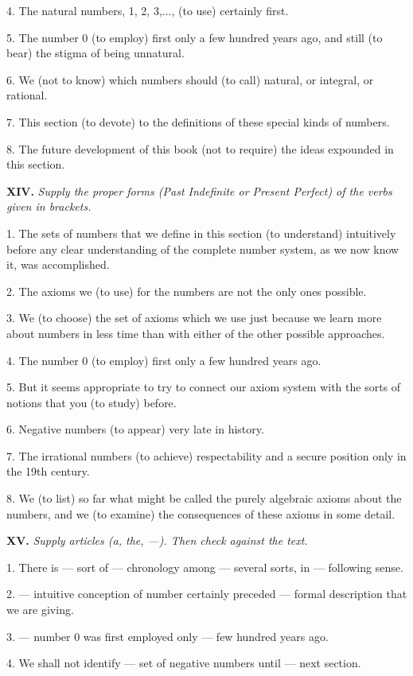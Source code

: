 \documentclass[a4paper]{article}
\newcommand{\ETask}[2]{\medskip\par\textbf{#1.} \textit{#2}\par}
\begin{document}
4. The natural numbers, 1, 2, 3,..., (to use) certainly first.

5. The number 0 (to employ) first only a few hundred years ago, and still (to bear) the stigma of being unnatural.

6. We (not to know) which numbers should (to call) natural, or integral, or rational.

7. This section (to devote) to the definitions of these special kinds of numbers.

8. The future development of this book (not to require) the ideas expounded in this section.

\ETask{XIV}{Supply the proper forms (Past Indefinite or Present Perfect) of the verbs given in brackets.}

1. The sets of numbers that we define in this section (to understand) intuitively before any clear understanding of the
complete number system, as we now know it, was accomplished.

2. The axioms we (to use) for the numbers are not the only ones possible.

3. We (to choose) the set of axioms which we use just because we learn more about numbers in less time than with either
of the other possible approaches.

4. The number 0 (to employ) first only a few hundred years ago.

5. But it seems appropriate to try to connect our axiom system with the sorts of notions that you (to study) before.

6. Negative numbers (to appear) very late in history.

7. The irrational numbers (to achieve) respectability and a secure position only in the 19th century.

8. We (to list) so far what might be called the purely algebraic axioms about the numbers, and we (to examine) the
consequences of these axioms in some detail.

\ETask{XV}{Supply articles (a, the, ---). Then check against the text.}

1. There is --- sort of --- chronology among --- several sorts, in --- following sense.

2. --- intuitive conception of number certainly preceded --- formal description that we are giving.

3. --- number 0 was first employed only --- few hundred years ago.

4. We shall not identify --- set of negative numbers until --- next section.
\end{document}

